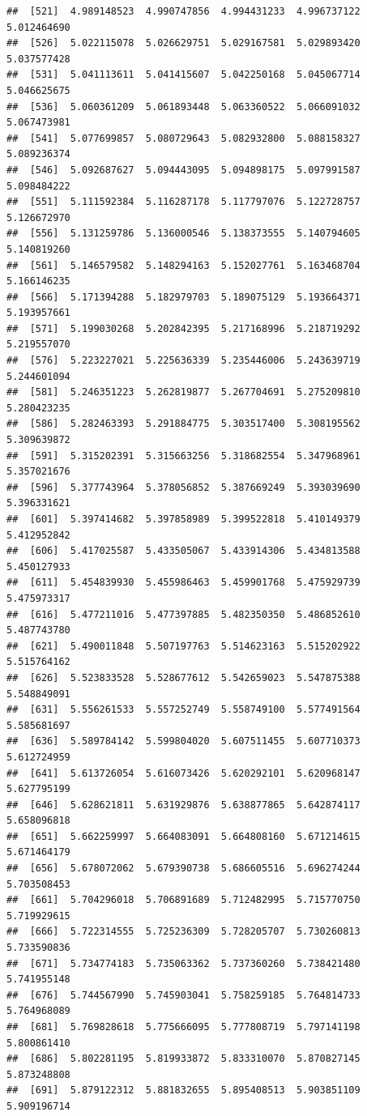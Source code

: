 \documentclass[
  11pt]{report}
\begin{document}
\begin{itemize}
\begin{verbatim}
##  [521]  4.989148523  4.990747856  4.994431233  4.996737122  5.012464690
##  [526]  5.022115078  5.026629751  5.029167581  5.029893420  5.037577428
##  [531]  5.041113611  5.041415607  5.042250168  5.045067714  5.046625675
##  [536]  5.060361209  5.061893448  5.063360522  5.066091032  5.067473981
##  [541]  5.077699857  5.080729643  5.082932800  5.088158327  5.089236374
##  [546]  5.092687627  5.094443095  5.094898175  5.097991587  5.098484222
##  [551]  5.111592384  5.116287178  5.117797076  5.122728757  5.126672970
##  [556]  5.131259786  5.136000546  5.138373555  5.140794605  5.140819260
##  [561]  5.146579582  5.148294163  5.152027761  5.163468704  5.166146235
##  [566]  5.171394288  5.182979703  5.189075129  5.193664371  5.193957661
##  [571]  5.199030268  5.202842395  5.217168996  5.218719292  5.219557070
##  [576]  5.223227021  5.225636339  5.235446006  5.243639719  5.244601094
##  [581]  5.246351223  5.262819877  5.267704691  5.275209810  5.280423235
##  [586]  5.282463393  5.291884775  5.303517400  5.308195562  5.309639872
##  [591]  5.315202391  5.315663256  5.318682554  5.347968961  5.357021676
##  [596]  5.377743964  5.378056852  5.387669249  5.393039690  5.396331621
##  [601]  5.397414682  5.397858989  5.399522818  5.410149379  5.412952842
##  [606]  5.417025587  5.433505067  5.433914306  5.434813588  5.450127933
##  [611]  5.454839930  5.455986463  5.459901768  5.475929739  5.475973317
##  [616]  5.477211016  5.477397885  5.482350350  5.486852610  5.487743780
##  [621]  5.490011848  5.507197763  5.514623163  5.515202922  5.515764162
##  [626]  5.523833528  5.528677612  5.542659023  5.547875388  5.548849091
##  [631]  5.556261533  5.557252749  5.558749100  5.577491564  5.585681697
##  [636]  5.589784142  5.599804020  5.607511455  5.607710373  5.612724959
##  [641]  5.613726054  5.616073426  5.620292101  5.620968147  5.627795199
##  [646]  5.628621811  5.631929876  5.638877865  5.642874117  5.658096818
##  [651]  5.662259997  5.664083091  5.664808160  5.671214615  5.671464179
##  [656]  5.678072062  5.679390738  5.686605516  5.696274244  5.703508453
##  [661]  5.704296018  5.706891689  5.712482995  5.715770750  5.719929615
##  [666]  5.722314555  5.725236309  5.728205707  5.730260813  5.733590836
##  [671]  5.734774183  5.735063362  5.737360260  5.738421480  5.741955148
##  [676]  5.744567990  5.745903041  5.758259185  5.764814733  5.764968089
##  [681]  5.769828618  5.775666095  5.777808719  5.797141198  5.800861410
##  [686]  5.802281195  5.819933872  5.833310070  5.870827145  5.873248808
##  [691]  5.879122312  5.881832655  5.895408513  5.903851109  5.909196714

\end{verbatim}
\end{itemize}
\end{document}
